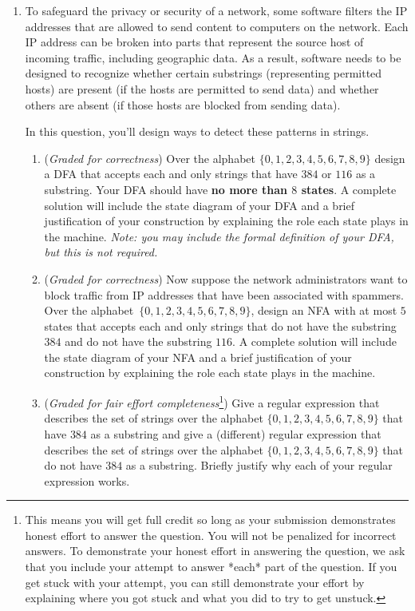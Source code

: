 \begin{enumerate}
\item  To safeguard the privacy or security of a network, some software filters
the IP addresses that are allowed to send content to computers on the network. Each IP address
can be broken into parts that represent the source host of incoming traffic, including geographic data.
As a result, software needs to be designed to recognize whether certain substrings (representing
permitted hosts) are present (if the hosts are permitted to send data) and whether others
are absent (if those hosts are blocked from sending data).

In this question, you'll design ways to detect these patterns in strings.

\begin{enumerate}
    \item ({\it Graded for correctness})
    Over the alphabet $\{0,1,2,3,4,5,6,7,8,9\}$ design a DFA that accepts each and only strings
    that have $384$ or $116$ as a substring. Your DFA should have {\bf no more than $8$ states}.
    A complete solution will include the state diagram of your DFA and a brief justification of
    your construction by explaining the role each state plays in the machine. {\it Note: you may 
    include the formal definition of your DFA, but this is not required.} 
    \item ({\it Graded for correctness})
    Now suppose the network administrators want to block traffic from IP addresses
    that have been associated with spammers. Over the alphabet~$\{0,1,2,3,4,5,6,7,8,9\}$, 
    design an NFA with at most $5$ states that accepts each and only strings
    that do not have the substring $384$ and do not have the substring $116$. 
    A complete solution will include the state diagram of your NFA and a brief justification 
    of your construction by explaining the role each state plays in the machine.
    \item ({\it Graded for fair effort completeness}\footnote{This means 
    you will get full credit so long as your submission demonstrates honest 
    effort to answer the question. You will not be penalized for incorrect answers. 
    To demonstrate your honest effort in answering the question, we ask that you 
    include your attempt to answer *each* part of the question. If you get stuck 
    with your attempt, you can still demonstrate your effort by explaining where 
    you got stuck and what you did to try to get unstuck.})
    Give a regular expression that describes the set of strings over 
    the alphabet $\{0,1,2,3,4,5,6,7,8,9\}$ that have $384$ as a substring and give
    a (different) regular expression that describes the set of strings over
    the alphabet $\{0,1,2,3,4,5,6,7,8,9\}$ that do not have $384$ as a substring. Briefly justify
    why each of your regular expression works.
\end{enumerate}


\end{enumerate}
